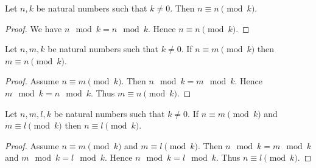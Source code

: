 \documentclass[10pt]{article}
\begin{document}
  \begin{forthel}
    \begin{proposition}[id=ARITHMETIC_08_3818318544764928,printid]
      Let $n, k$ be natural numbers such that $k \neq 0$.
      Then $n \equiv n \pmod{k}$.
    \end{proposition}
    \begin{proof}
      We have $n \mod k = n \mod k$.
      Hence $n \equiv n \pmod{k}$.
    \end{proof}
  \end{forthel}

  \begin{forthel}
    \begin{proposition}[id=ARITHMETIC_08_2337210737098752,printid]
      Let $n, m, k$ be natural numbers such that $k \neq 0$.
      If $n \equiv m \pmod{k}$ then $m \equiv n \pmod{k}$.
    \end{proposition}
    \begin{proof}
      Assume $n \equiv m \pmod{k}$.
      Then $n \mod k = m \mod k$.
      Hence $m \mod k = n \mod k$.
      Thus $m \equiv n \pmod{k}$.
    \end{proof}
  \end{forthel}

  \begin{forthel}
    \begin{proposition}[id=ARITHMETIC_08_7464329746055168,printid]
      Let $n, m, l, k$ be natural numbers such that $k \neq 0$.
      If $n \equiv m \pmod{k}$ and $m \equiv l \pmod{k}$ then $n \equiv l \pmod{k}$.
    \end{proposition}
    \begin{proof}
      Assume $n \equiv m \pmod{k}$ and $m \equiv l \pmod{k}$.
      Then $n \mod k = m \mod k$ and $m \mod k = l \mod k$.
      Hence $n \mod k = l \mod k$.
      Thus $n \equiv l \pmod{k}$.
    \end{proof}
  \end{forthel}
\end{document}

